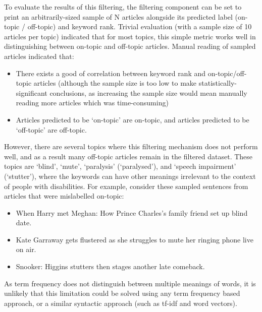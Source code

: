 \documentclass{report}
\begin{document}
To evaluate the results of this filtering, the filtering component can be set to print an arbitrarily-sized sample of N articles alongside its predicted label (on-topic / off-topic) and keyword rank.
Trivial evaluation (with a sample size of 10 articles per topic) indicated that for most topics, this simple metric works well in distinguishing between on-topic and off-topic articles.
Manual reading of sampled articles indicated that:
\begin{itemize}
	\item There exists a good of correlation between keyword rank and on-topic/off-topic articles (although the sample size is too low to make statistically-significant conclusions, as increasing the sample size would mean manually reading more articles which was time-consuming)
	\item Articles predicted to be `on-topic' are on-topic, and articles predicted to be `off-topic' are off-topic.
\end{itemize}

However, there are several topics where this filtering mechanism does not perform well, and as a result many off-topic articles remain in the filtered dataset.
These topics are `blind', `mute', `paralysis' (`paralysed'), and `speech impairment' (`stutter'), where the keywords can have other meanings irrelevant to the context of people with disabilities.
For example, consider these sampled sentences from articles that were mislabelled on-topic:
\begin{itemize}
	\item When Harry met Meghan: How Prince Charles's family friend set up blind date.
	\item Kate Garraway gets flustered as she struggles to mute her ringing phone live on air.
	\item Snooker: Higgins stutters then stages another late comeback.
\end{itemize}
As term frequency does not distinguish between multiple meanings of words, it is unlikely that this limitation could be solved using any term frequency based approach, or a similar syntactic approach (such as tf-idf and word vectors).
\end{document}
